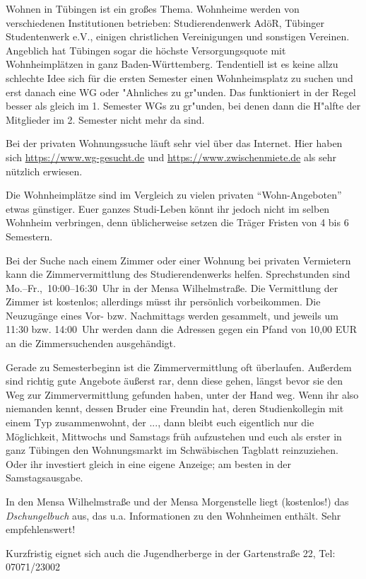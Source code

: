 Wohnen in Tübingen ist ein großes Thema.  Wohnheime werden von
  verschiedenen Institu\-tionen betrieben: Studierendenwerk AdöR,
  Tübinger Studentenwerk e.V., einigen christlichen Vereinigungen und
  sonstigen Vereinen.  Angeblich hat Tübingen sogar die höchste
  Versorgungsquote mit Wohnheimplätzen in ganz Baden-Württemberg.
 Tendentiell ist es keine allzu schlechte Idee sich für die ersten Semester einen Wohnheimsplatz
 zu suchen und erst danach eine WG oder  "Ahnliches zu gr"unden. Das funktioniert
 in der Regel besser als gleich im 1. Semester WGs zu gr"unden, bei denen dann die H"alfte der Mitglieder im
 2. Semester nicht mehr da sind.

Bei der privaten Wohnungssuche läuft sehr viel über das Internet. Hier haben sich \url{https://www.wg-gesucht.de} und \url{https://www.zwischenmiete.de} als sehr nützlich erwiesen.

Die Wohnheimplätze sind im Vergleich zu vielen privaten
  "`Wohn-Angeboten"' etwas günstiger.  Euer ganzes Studi-Leben könnt
  ihr jedoch nicht im selben Wohnheim verbringen, denn üblicherweise
  setzen die Träger Fristen von 4 bis 6 Semestern.

Bei der Suche nach einem Zimmer oder einer Wohnung bei privaten
  Vermietern kann die Zimmervermittlung des Studierendenwerks helfen.
  Sprechstunden sind Mo.--Fr.,~10:00--16:30~Uhr in der Mensa Wilhelmstraße.
  Die Vermittlung der Zimmer ist kostenlos; allerdings müsst ihr persönlich vorbeikommen.
  Die Neuzugänge  eines Vor- bzw. Nachmittags werden gesammelt, und jeweils um
  11:30 bzw. 14:00~Uhr werden dann die
  Adressen gegen ein Pfand von 10,00 EUR an die Zimmersuchenden
  ausgehändigt.
  
Gerade zu Semesterbeginn ist die Zimmervermittlung oft überlaufen.
  Außerdem sind richtig gute Angebote äußerst rar, denn diese
  gehen, längst bevor sie den Weg zur Zimmervermittlung gefunden
  haben, unter der Hand weg.  Wenn ihr also niemanden kennt, dessen
  Bruder eine Freundin hat, deren Studienkollegin mit einem Typ
  zusammenwohnt, der ..., dann bleibt euch eigentlich nur die
  Möglichkeit, Mittwochs und Samstags früh aufzustehen und euch
  als erster in ganz Tübingen den Wohnungsmarkt im Schwäbischen
  Tagblatt reinzuziehen.  Oder ihr investiert gleich in eine eigene
  Anzeige;  am besten in der Samstagsausgabe.

In den Mensa Wilhelmstraße und der Mensa
  Morgenstelle liegt (kostenlos!) das \emph{Dschungelbuch} aus, das
  u.a. Informationen zu den Wohnheimen enthält. Sehr empfehlenswert!
\enlargethispage{1ex}

Kurzfristig eignet sich auch die Jugendherberge in der Gartenstraße 22, Tel: 07071/23002
